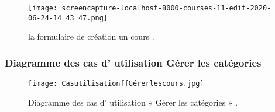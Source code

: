 
\begin{figure}[ht]
	\centering
	\texttt{[image: screencapture-localhost-8000-courses-11-edit-2020-06-24-14\_43\_47.png]}
	\caption{la formulaire de création un cours .}
	\label{fig: la formulaire de création un cours  }
\end{figure}
\FloatBarrier
\clearpage


\subsubsection{Diagramme des cas d' utilisation  Gérer les catégories }
\begin{figure}[ht]
	\centering
	\texttt{[image: CasutilisationffGérerlescours.jpg]}
	\caption{Diagramme des cas d' utilisation « Gérer les catégories » .}
	\label{fig:Diagramme des cas d' utilisation Gérer les catégories  }
\end{figure}
\FloatBarrier




